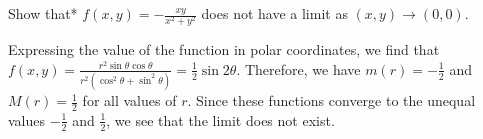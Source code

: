 \documentclass{watsonbook}
\begin{document}
\begin{example}{}{}
  Show that* $f(x,y) = -\frac{xy}{x^2 + y^2}$ does not have a limit as
  $(x,y) \to (0,0)$. 
\end{example}

\begin{solution}
  Expressing the value of the function in polar coordinates, we find
  that
  $f(x,y) =\frac{ r^2 \sin \theta \cos \theta}{r^2(\cos^2 \theta + \sin^2
  \theta)} = \tfrac{1}{2} \sin 2\theta$. Therefore, we have $m(r) =
-\tfrac{1}{2}$ and $M(r) = \tfrac{1}{2}$ for all values of $r$. Since
these functions converge to the unequal values $-\tfrac{1}{2}$ and
$\tfrac{1}{2}$, we see that the limit does not exist. 
\end{solution}
\end{document}
